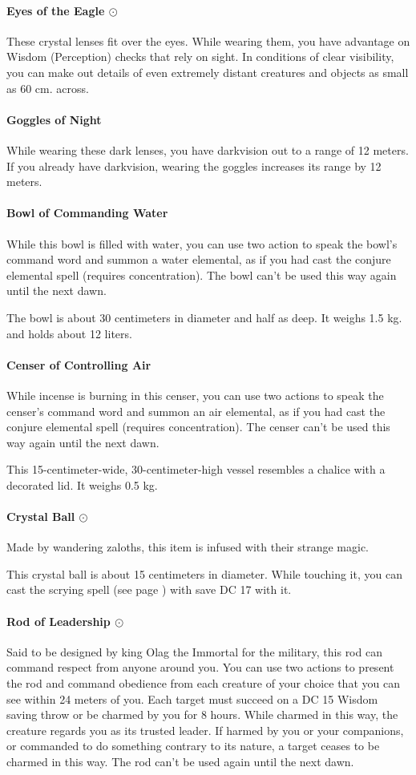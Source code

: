 \paragraph{Eyes of the Eagle $\odot$}
    These crystal lenses fit over the eyes.
    While wearing them, you have advantage on Wisdom (Perception) checks that rely on sight.
    In conditions of clear visibility, you can make out details of even extremely distant creatures and objects as small as 60 cm. across.
\paragraph{Goggles of Night}
    While wearing these dark lenses, you have darkvision out to a range of 12 meters.
    If you already have darkvision, wearing the goggles increases its range by 12 meters.
\paragraph{Bowl of Commanding Water}
    While this bowl is filled with water, you can use two action to speak the bowl's command word and summon a water elemental, as if you had cast the conjure elemental spell (requires concentration).
    The bowl can't be used this way again until the next dawn.

    The bowl is about 30 centimeters in diameter and half as deep.
    It weighs 1.5 kg. and holds about 12 liters.
\paragraph{Censer of Controlling Air}
    While incense is burning in this censer, you can use two actions to speak the censer's command word and summon an air elemental, as if you had cast the conjure elemental spell (requires concentration).
    The censer can't be used this way again until the next dawn.

    This 15-centimeter-wide, 30-centimeter-high vessel resembles a chalice with a decorated lid.
    It weighs 0.5 kg.
\paragraph{Crystal Ball $\odot$}
    Made by wandering zaloths, this item is infused with their strange magic.

    This crystal ball is about 15 centimeters in diameter.
    While touching it, you can cast the scrying spell (see page \pageref{spell::scrying}) with save DC 17 with it.
\paragraph{Rod of Leadership $\odot$}
    Said to be designed by king Olag the Immortal for the military, this rod can command respect from anyone around you.
    You can use two actions to present the rod and command obedience from each creature of your choice that you can see within 24 meters of you.
    Each target must succeed on a DC 15 Wisdom saving throw or be charmed by you for 8 hours.
    While charmed in this way, the creature regards you as its trusted leader.
    If harmed by you or your companions, or commanded to do something contrary to its nature, a target ceases to be charmed in this way.
    The rod can't be used again until the next dawn.
